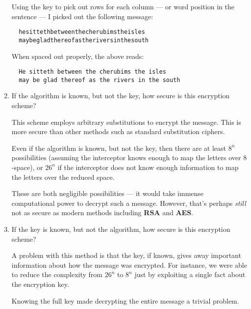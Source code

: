 \begin{problem}
\begin{enumerate}
\begin{Answer}
\noindent
Using the key to pick out rows for each column --- or word position in the sentence ---
I picked out the following message:

{\color{crimson}
\begin{verbatim}
  hesittethbetweenthecherubimstheisles
  maybegladthereofastheriversinthesouth
\end{verbatim}
}
\noindent
When spaced out properly, the above reads:
{\color{crimson}
\begin{verbatim}
  He sitteth between the cherubims the isles
  may be glad thereof as the rivers in the south
\end{verbatim}
}

\end{Answer}
\item If the algorithm is known, but not the key, how secure is this
encryption scheme?

\begin{Answer}
This scheme employs arbitrary substitutions to encrypt the message.
This is more secure than other methods such as standard substitution ciphers.

\noindent
Even if the algorithm is known, but not the key, then there are at least $8^{n}$ possibilities
(assuming the interceptor knows enough to map the letters over $8$-space), or $26^{n}$
if the interceptor does not know enough information to map the letters over the reduced space.

\noindent
These are both negligible possibilities --- it would take immense computational power to
decrypt such a message.
However, that's perhaps \textit{still} not as secure as modern methods 
including \textbf{RSA} and \textbf{AES}.
\end{Answer}

\item If the key is known, but not the algorithm, how secure is this
encryption scheme?

\begin{Answer}
  A problem with this method is that the key, if known, gives away important information about how
  the message was encrypted. For instance, we were able to reduce the complexity from $26^{n}$ to $8^{n}$
  just by exploiting a single fact about the encryption key.

\noindent
Knowing the full key made decrypting the entire message a trivial problem.
\end{Answer}
\end{enumerate}
\end{problem}
